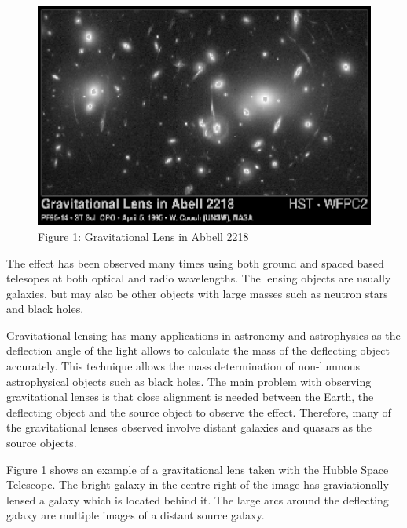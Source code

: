 \documentclass[a4paper]{IEEEtran}
\begin{document}
\begin{figure}[h] 
    \caption{Figure 1: Gravitational Lens in Abbell 2218} 
    \label{fig:abbell} 
    \begin{center}
        \includegraphics[width=0.9\columnwidth]{images/hubble.eps}
    \end{center}
\end{figure}

The effect has been observed many times using both ground and spaced
based telesopes at both optical and radio wavelengths. The lensing objects
are usually galaxies, but may also be other objects with large masses
such as neutron stars and black holes. 

Gravitational lensing has many applications in astronomy and astrophysics
as the deflection angle of the light allows to calculate the mass
of the deflecting object accurately. This technique allows the mass determination
of non-lumnous astrophysical objects such as black holes.
The main problem with observing gravitational lenses is that close
alignment is needed between the Earth, the deflecting object and 
the source object to observe the effect. Therefore, many of the gravitational
lenses observed involve distant galaxies and quasars as the source objects.

Figure 1 shows an example of a gravitational lens taken with the 
Hubble Space Telescope. The bright galaxy in the centre right of the image
has graviationally lensed a galaxy which is located behind it. 
The large arcs around the deflecting galaxy are multiple images of 
a distant source galaxy.
\end{document}
